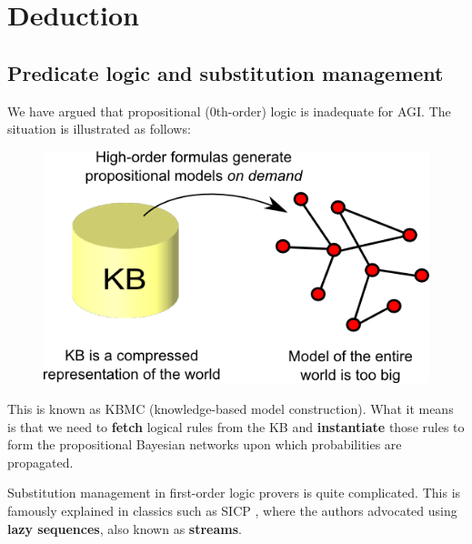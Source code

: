 \section{Deduction}
\label{sec:deduction}

\subsection{Predicate logic and substitution management}
\label{sec:substitution-management}

We have argued that propositional (0th-order) logic is inadequate for AGI.  The situation is illustrated as follows:
\begin{figure}[H]
\centering
\includegraphics[scale=0.75]{KBMC-illustrated.png}
\end{figure}
This is known as KBMC (knowledge-based model construction).  What it means is that we need to \textbf{fetch} logical rules from the KB and \textbf{instantiate} those rules to form the propositional Bayesian networks upon which probabilities are propagated.

Substitution management in first-order logic provers is quite complicated.  This is famously explained in classics such as SICP \citep*{Abelson1984}, where the authors advocated using \textbf{lazy sequences}, also known as \textbf{streams}.

